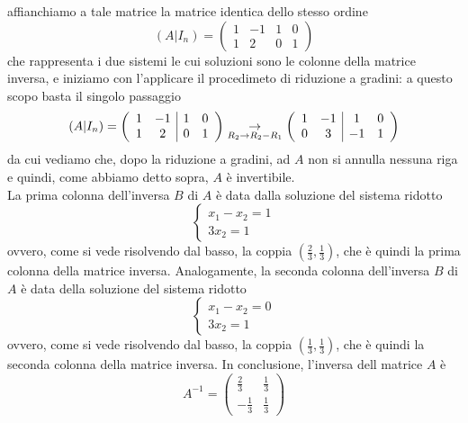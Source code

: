 \documentclass{book}
\begin{document}
affianchiamo a tale matrice la matrice identica dello stesso ordine
\begin{equation*}
  (A|I_n)=\left(
  \begin{array}{cc|cc}
    1&-1&1&0\\
    1&2&0&1
  \end{array}\right)
\end{equation*}
che rappresenta i due sistemi le cui soluzioni sono le colonne della matrice inversa, e iniziamo con
l'applicare il procedimeto di riduzione a gradini: a questo scopo basta il singolo passaggio
\begin{equation}
  \label{eq:4.31}
  (A|I_n)=\left(
  \begin{array}{cc|cc}
    1&-1&1&0\\
    1&2&0&1
  \end{array}\right) \underset{R_2\to R_2-R_1}{\to} \left(
  \begin{array}[center]{cc|cc}
    1 &-1 & 1 &0\\
    0 & 3 & -1 &1
  \end{array}\right)
\end{equation}
da cui vediamo che, dopo la riduzione a gradini, ad $A$ non si annulla nessuna riga e quindi, come abbiamo detto
sopra, $A$ è invertibile.\\
La prima colonna dell'inversa $B$ di $A$ è data dalla soluzione del sistema ridotto
\begin{equation}
  \label{eq:4.32}
  \begin{cases}
    x_1-x_2=1\\
    3x_2=1
  \end{cases}
\end{equation}
ovvero, come si vede risolvendo dal basso, la coppia $\left(\frac{2}{3},\frac{1}{3}\right)$, che è quindi
la prima colonna della matrice inversa. Analogamente, la seconda colonna dell'inversa $B$ di $A$ è data della
soluzione del sistema ridotto
\begin{equation}
  \label{eq:4.33}
  \begin{cases}
    x_1-x_2=0\\
    3x_2=1
  \end{cases}
\end{equation}
ovvero, come si vede risolvendo dal basso, la coppia $\left(\frac{1}{3},\frac{1}{3}\right)$, che è quindi la
seconda colonna della matrice inversa. In conclusione, l'inversa dell matrice $A$ è
\begin{equation*}
  A^{-1}=
  \begin{pmatrix}
    \frac{2}{3} &\frac{1}{3}\\
    -\frac{1}{3} & \frac{1}{3}
  \end{pmatrix}
\end{equation*}
\end{document}
